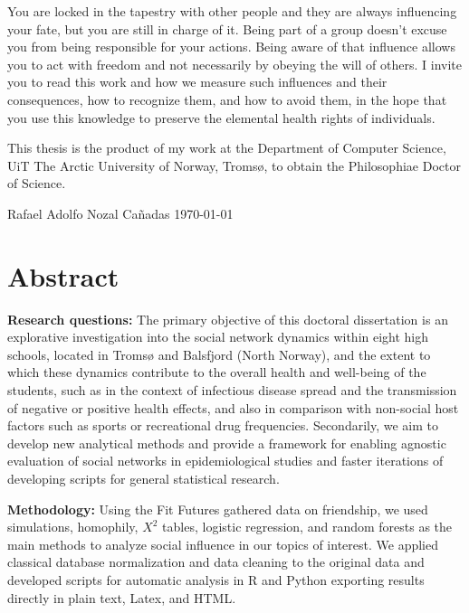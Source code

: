 \documentclass[12pt,twoside,a4paper,fleqn, english]{report}
\begin{document}
        You are locked in the tapestry with other people and they are always influencing your fate, but you are still in charge of it. Being part of a group doesn't excuse you from being responsible for your actions. Being aware of that influence allows you to act with freedom and not necessarily by obeying the will of others. I invite you to read this work and how we measure such influences and their consequences, how to recognize them, and how to avoid them, in the hope that you use this knowledge to preserve the elemental health rights of individuals.

        This thesis is the product of my work at the Department of Computer Science, UiT The Arctic University of Norway, Tromsø, to obtain the Philosophiae Doctor of Science.

        Rafael Adolfo Nozal Cañadas
        \today

    \cleardoublepage


\chapter*{Abstract}

\textbf{Research questions:} The primary objective of this doctoral dissertation is an explorative investigation into the social network dynamics within eight high schools, located in Tromsø and Balsfjord (North Norway), and the extent to which these dynamics contribute to the overall health and well-being of the students, such as in the context of infectious disease spread and the transmission of negative or positive health effects, and also in comparison with non-social host factors such as sports or recreational drug frequencies. Secondarily, we aim to develop new analytical methods and provide a framework for enabling agnostic evaluation of social networks in epidemiological studies and faster iterations of developing scripts for general statistical research.

\vspace{0.70\baselineskip} %

\textbf{Methodology:} Using the Fit Futures gathered data on friendship, we used simulations, homophily, $X^2$ tables, logistic regression, and random forests as the main methods to analyze social influence in our topics of interest. We applied classical database normalization and data cleaning to the original data and developed scripts for automatic analysis in R and Python exporting results directly in plain text, Latex, and HTML.
\end{document}
